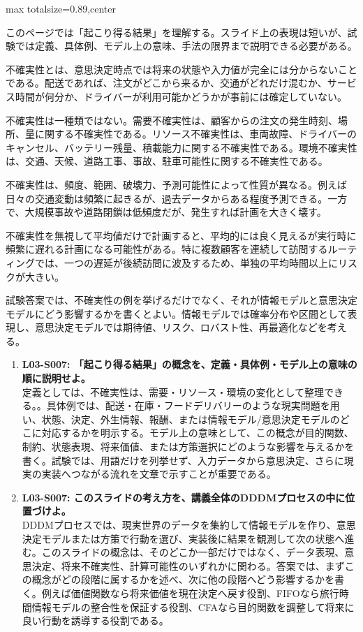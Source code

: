 \begin{minipage}[t]{0.58\textwidth}
\begin{adjustbox}{max totalsize={\textwidth}{0.89\textheight},center}
\begin{minipage}{\textwidth}\scriptsize
{}このページでは「起こり得る結果」を理解する。スライド上の表現は短いが、試験では定義、具体例、モデル上の意味、手法の限界まで説明できる必要がある。\par
不確実性とは、意思決定時点では将来の状態や入力値が完全には分からないことである。配送であれば、注文がどこから来るか、交通がどれだけ混むか、サービス時間が何分か、ドライバーが利用可能かどうかが事前には確定していない。\par
不確実性は一種類ではない。需要不確実性は、顧客からの注文の発生時刻、場所、量に関する不確実性である。リソース不確実性は、車両故障、ドライバーのキャンセル、バッテリー残量、積載能力に関する不確実性である。環境不確実性は、交通、天候、道路工事、事故、駐車可能性に関する不確実性である。\par
不確実性は、頻度、範囲、破壊力、予測可能性によって性質が異なる。例えば日々の交通変動は頻繁に起きるが、過去データからある程度予測できる。一方で、大規模事故や道路閉鎖は低頻度だが、発生すれば計画を大きく壊す。\par
不確実性を無視して平均値だけで計画すると、平均的には良く見えるが実行時に頻繁に遅れる計画になる可能性がある。特に複数顧客を連続して訪問するルーティングでは、一つの遅延が後続訪問に波及するため、単独の平均時間以上にリスクが大きい。\par
試験答案では、不確実性の例を挙げるだけでなく、それが情報モデルと意思決定モデルにどう影響するかを書くとよい。情報モデルでは確率分布や区間として表現し、意思決定モデルでは期待値、リスク、ロバスト性、再最適化などを考える。\par{}\begin{enumerate}\item \textbf{L03-S007: 「起こり得る結果」の概念を、定義・具体例・モデル上の意味の順に説明せよ。}\\定義としては、不確実性は、需要・リソース・環境の変化として整理できる。。具体例では、配送・在庫・フードデリバリーのような現実問題を用い、状態、決定、外生情報、報酬、または情報モデル/意思決定モデルのどこに対応するかを明示する。モデル上の意味として、この概念が目的関数、制約、状態表現、将来価値、または方策選択にどのような影響を与えるかを書く。試験では、用語だけを列挙せず、入力データから意思決定、さらに現実の実装へつながる流れを文章で示すことが重要である。\item \textbf{L03-S007: このスライドの考え方を、講義全体のDDDMプロセスの中に位置づけよ。}\\DDDMプロセスでは、現実世界のデータを集約して情報モデルを作り、意思決定モデルまたは方策で行動を選び、実装後に結果を観測して次の状態へ進む。このスライドの概念は、そのどこか一部だけではなく、データ表現、意思決定、将来不確実性、計算可能性のいずれかに関わる。答案では、まずこの概念がどの段階に属するかを述べ、次に他の段階へどう影響するかを書く。例えば価値関数なら将来価値を現在決定へ戻す役割、FIFOなら旅行時間情報モデルの整合性を保証する役割、CFAなら目的関数を調整して将来に良い行動を誘導する役割である。\end{enumerate}

\end{minipage}
\end{adjustbox}
\end{minipage}
